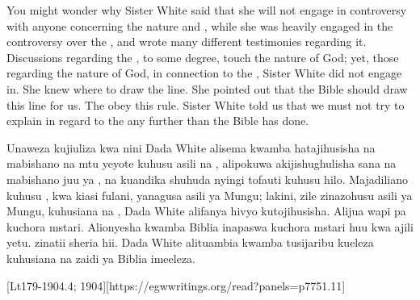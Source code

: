 You might wonder why Sister White said that she will not engage in controversy with anyone concerning the nature and , while she was heavily engaged in the controversy over the , and wrote many different testimonies regarding it. Discussions regarding the , to some degree, touch the nature of God; yet, those regarding the nature of God, in connection to the , Sister White did not engage in. She knew where to draw the line. She pointed out that the Bible should draw this line for us.  The  obey this rule. Sister White told us that we must not try to explain in regard to the  any further than the Bible has done.


Unaweza kujiuliza kwa nini Dada White alisema kwamba hatajihusisha na mabishano na mtu yeyote kuhusu asili na , alipokuwa akijishughulisha sana na mabishano juu ya , na kuandika shuhuda nyingi tofauti kuhusu hilo. Majadiliano kuhusu , kwa kiasi fulani, yanagusa asili ya Mungu; lakini, zile zinazohusu asili ya Mungu, kuhusiana na , Dada White alifanya hivyo kutojihusisha. Alijua wapi pa kuchora mstari. Alionyesha kwamba Biblia inapaswa kuchora mstari huu kwa ajili yetu.   zinatii sheria hii. Dada White alituambia kwamba tusijaribu kueleza kuhusiana na  zaidi ya Biblia imeeleza.


[Lt179-1904.4; 1904][https://egwwritings.org/read?panels=p7751.11]


